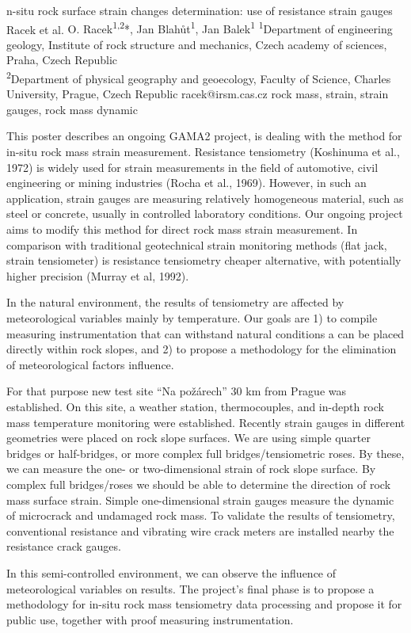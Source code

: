 \abstract
{n-situ rock surface strain changes determination: use of resistance strain gauges} 
{Racek et al.} 
{O. Racek\textsuperscript{1,2}*, Jan Blahůt\textsuperscript{1}, Jan Balek\textsuperscript{1}} 
{\POtag} 
{
\textsuperscript{1}Department of engineering geology, Institute of rock structure and mechanics, Czech academy of sciences, Praha, Czech Republic\\
\textsuperscript{2}Department of physical geography and geoecology, Faculty of Science, Charles University, Prague, Czech Republic
}
{racek@irsm.cas.cz}  %
{rock mass, strain, strain gauges, rock mass dynamic}
{This poster describes an ongoing GAMA2 project, is dealing with the method for in-situ rock mass strain measurement. Resistance tensiometry (Koshinuma et al., 1972) is widely used for strain measurements in the field of automotive, civil engineering or mining industries (Rocha et al., 1969). However, in such an application, strain gauges are measuring relatively homogeneous material, such as steel or concrete, usually in controlled laboratory conditions. Our ongoing project aims to modify this method for direct rock mass strain measurement. In comparison with traditional geotechnical strain monitoring methods (flat jack, strain tensiometer) is resistance tensiometry cheaper alternative, with potentially higher precision (Murray et al, 1992).

In the natural environment, the results of tensiometry are affected by meteorological variables mainly by temperature. Our goals are 1) to compile measuring instrumentation that can withstand natural conditions a can be placed directly within rock slopes, and 2) to propose a methodology for the elimination of meteorological factors influence. 

For that purpose new test site \enquote{Na požárech} 30 km from Prague was established. On this site, a weather station, thermocouples, and in-depth rock mass temperature monitoring were established. Recently strain gauges in different geometries were placed on rock slope surfaces. We are using simple quarter bridges or half-bridges, or more complex full bridges/tensiometric roses. By these, we can measure the one- or two-dimensional strain of rock slope surface. By complex full bridges/roses we should be able to determine the direction of rock mass surface strain. Simple one-dimensional strain gauges measure the dynamic of microcrack and undamaged rock mass. To validate the results of tensiometry, conventional resistance and vibrating wire crack meters are installed nearby the resistance crack gauges. 

In this semi-controlled environment, we can observe the influence of meteorological variables on results. The project’s final phase is to propose a methodology for in-situ rock mass tensiometry data processing and propose it for public use, together with proof measuring instrumentation. 
}
